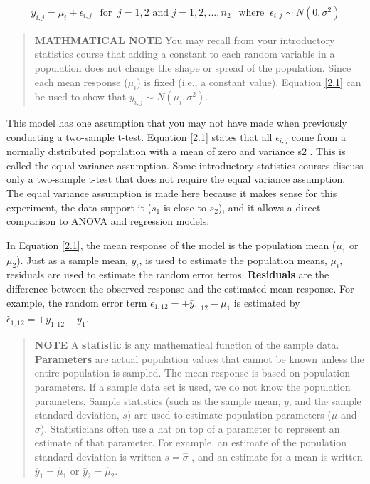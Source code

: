 \documentclass[
]{report}
\begin{document}
\begin{align} \label{2.1}
y_{i, j} = \mu_i + \epsilon_{i, j} ~~\text{ for }~ j = 1, 2 \text{ and } j = 1, 2, ... ,n_2 ~~\text{ where }~  \epsilon_{i, j} \sim N(0,\sigma^2)
\tag{2.1}
\end{align}

\begin{quote}
\textbf{MATHMATICAL NOTE}
You may recall from your introductory statistics course that adding a constant to each random variable in a population does not change the shape or spread of the population. Since each mean response (\(\mu_i\)) is fixed (i.e., a constant value), Equation \ref{2.1} can be used to show that \(y_{i, j} \sim N(\mu_i,\sigma^2)\).
\end{quote}

This model has one assumption that you may not have made when previously conducting a two-sample t-test. Equation \ref{2.1} states that all \(\epsilon_{i, j}\) come from a normally distributed population with a mean of zero and
variance s2 . This is called the equal variance assumption. Some introductory statistics courses discuss only a two-sample t-test that does not require the equal variance assumption. The equal variance assumption is
made here because it makes sense for this experiment, the data support it (\(s_1\) is close to \(s_2\)), and it allows a direct comparison to ANOVA and regression models.

In Equation \ref{2.1}, the mean response of the model is the population mean (\(\mu_1\) or \(\mu_2\)). Just as a sample mean, \(\bar{y}_i\), is used to estimate the population means, \(\mu_i\), residuals are used to estimate the random error terms. \textbf{Residuals} are the difference between the observed response and the estimated mean response. For example, the random error term \(\epsilon_{1, 12} = + \bar{y}_{1, 12} - \mu_1\) is estimated by \(\hat{\epsilon}_{1, 12} = + \bar{y}_{1, 12} - \bar{y}_1\).

\begin{quote}
\textbf{NOTE}
A \textbf{statistic} is any mathematical function of the sample data. \textbf{Parameters} are actual population values that cannot be known unless the entire population is sampled. The mean response is based on population parameters. If a sample data set is used, we do not know the population parameters. Sample statistics (such as the sample mean, \(\bar{y}\), and the sample standard deviation, \(s\)) are used to estimate population parameters (\(\mu\) and \(\sigma\)). Statisticians often use a hat on top of a parameter to represent an estimate of that parameter. For example, an estimate of the population standard deviation is written \(s = \hat{\sigma}\) , and an estimate for a mean is written \(\bar{y}_1 = \hat{\mu}_1\) or \(\bar{y}_2 = \hat{\mu}_2\).
\end{quote}
\end{document}
